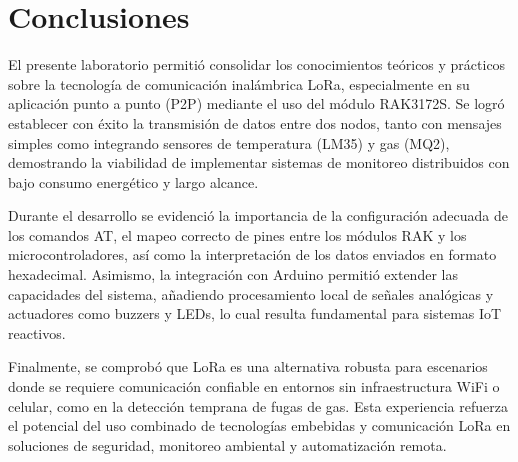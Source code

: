 \section{Conclusiones}

El presente laboratorio permitió consolidar los conocimientos teóricos y prácticos sobre la tecnología de comunicación inalámbrica LoRa, especialmente en su aplicación punto a punto (P2P) mediante el uso del módulo RAK3172S. Se logró establecer con éxito la transmisión de datos entre dos nodos, tanto con mensajes simples como integrando sensores de temperatura (LM35) y gas (MQ2), demostrando la viabilidad de implementar sistemas de monitoreo distribuidos con bajo consumo energético y largo alcance.

Durante el desarrollo se evidenció la importancia de la configuración adecuada de los comandos AT, el mapeo correcto de pines entre los módulos RAK y los microcontroladores, así como la interpretación de los datos enviados en formato hexadecimal. Asimismo, la integración con Arduino permitió extender las capacidades del sistema, añadiendo procesamiento local de señales analógicas y actuadores como buzzers y LEDs, lo cual resulta fundamental para sistemas IoT reactivos.

Finalmente, se comprobó que LoRa es una alternativa robusta para escenarios donde se requiere comunicación confiable en entornos sin infraestructura WiFi o celular, como en la detección temprana de fugas de gas. Esta experiencia refuerza el potencial del uso combinado de tecnologías embebidas y comunicación LoRa en soluciones de seguridad, monitoreo ambiental y automatización remota.
